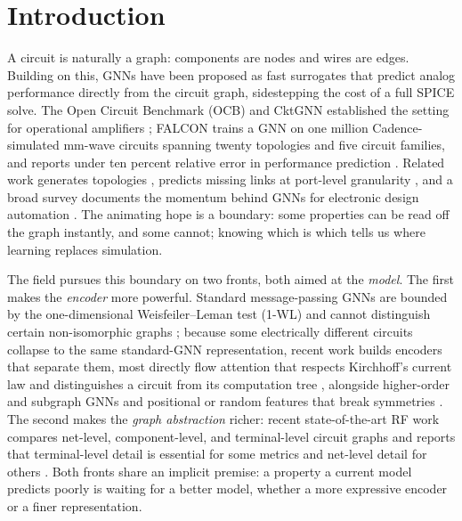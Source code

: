 \documentclass[10pt]{article}
\begin{document}
\begin{abstract}
\end{abstract}

\section{Introduction}

A circuit is naturally a graph: components are nodes and wires are edges. Building on this, GNNs have been proposed as fast surrogates that predict analog performance directly from the circuit graph, sidestepping the cost of a full SPICE solve. The Open Circuit Benchmark (OCB) and CktGNN established the setting for operational amplifiers \citep{dong2023cktgnn}; FALCON trains a GNN on one million Cadence-simulated mm-wave circuits spanning twenty topologies and five circuit families, and reports under ten percent relative error in performance prediction \citep{mehradfar2025falcon}. Related work generates topologies \citep{gao2025analoggenie}, predicts missing links at port-level granularity \citep{pan2025gnnaclp}, and a broad survey documents the momentum behind GNNs for electronic design automation \citep{sanchez2023survey}. The animating hope is a boundary: some properties can be read off the graph instantly, and some cannot; knowing which is which tells us where learning replaces simulation.

The field pursues this boundary on two fronts, both aimed at the \emph{model}. The first makes the \emph{encoder} more powerful. Standard message-passing GNNs are bounded by the one-dimensional Weisfeiler--Leman test (1-WL) and cannot distinguish certain non-isomorphic graphs \citep{xu2019gin,morris2019wl,weisfeiler1968reduction}; because some electrically different circuits collapse to the same standard-GNN representation, recent work builds encoders that separate them, most directly flow attention that respects Kirchhoff's current law and distinguishes a circuit from its computation tree \citep{plettenberg2025flow}, alongside higher-order and subgraph GNNs \citep{morris2019wl,bevilacqua2022esan} and positional or random features that break symmetries \citep{sato2021random,loukas2020cannotlearn}. The second makes the \emph{graph abstraction} richer: recent state-of-the-art RF work compares net-level, component-level, and terminal-level circuit graphs and reports that terminal-level detail is essential for some metrics and net-level detail for others \citep{asadi2025rfinformed}. Both fronts share an implicit premise: a property a current model predicts poorly is waiting for a better model, whether a more expressive encoder or a finer representation.
\end{document}
